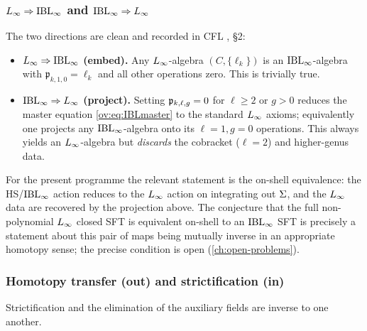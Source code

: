 \subsubsection{\texorpdfstring{$L_\infty\Rightarrow\mathrm{IBL}_\infty$}{L to IBL} and
\texorpdfstring{$\mathrm{IBL}_\infty\Rightarrow L_\infty$}{IBL to L}}

The two directions are clean and recorded in CFL \cite{Cieliebak:2015:HomologicalAlgebraRelated}, §2:
\begin{itemize}[leftmargin=*]
	\item \textbf{$L_\infty\Rightarrow\mathrm{IBL}_\infty$ (embed).} Any $L_\infty$-algebra $(C,\{\ell_k\})$ is an
	$\mathrm{IBL}_\infty$-algebra with $\mathfrak{p}_{k,1,0}=\ell_k$ and all other operations zero. This is
	trivially true.
	\item \textbf{$\mathrm{IBL}_\infty\Rightarrow L_\infty$ (project).} Setting $\mathfrak{p}_{k,\ell,g}=0$ for $\ell\ge2$ or $g>0$
	reduces the master equation \eqref{ov:eq:IBLmaster} to the standard $L_\infty$ axioms; equivalently
	one projects any $\mathrm{IBL}_\infty$-algebra onto its $\ell=1,g=0$ operations. This always yields an
	$L_\infty$-algebra but \emph{discards} the cobracket ($\ell=2$) and higher-genus data.
\end{itemize}
For the present programme the relevant statement is the on-shell equivalence: the HS/$\mathrm{IBL}_\infty$
action reduces to the $L_\infty$ action on integrating out $\Sigma$, and the $L_\infty$ data are recovered
by the projection above. The conjecture that the full non-polynomial $L_\infty$ closed SFT is
equivalent on-shell to an $\mathrm{IBL}_\infty$ SFT is precisely a statement
about this pair of maps being mutually inverse in an appropriate homotopy sense; the precise
condition is open (\cref{ch:open-problems}).

\subsubsection{Homotopy transfer (out) and strictification (in)}

Strictification and the elimination of the auxiliary fields are inverse to one another.

